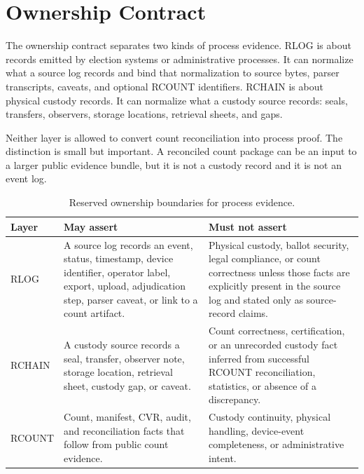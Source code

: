 \section{Ownership Contract}

The ownership contract separates two kinds of process evidence. RLOG is about
records emitted by election systems or administrative processes. It can
normalize what a source log records and bind that normalization to source
bytes, parser transcripts, caveats, and optional RCOUNT identifiers. RCHAIN is
about physical custody records. It can normalize what a custody source records:
seals, transfers, observers, storage locations, retrieval sheets, and gaps.

Neither layer is allowed to convert count reconciliation into process proof.
The distinction is small but important. A reconciled count package can be an
input to a larger public evidence bundle, but it is not a custody record and it
is not an event log.

\begin{table}[h]
\centering
\small
\begin{tabularx}{\textwidth}{@{}lXX@{}}
\toprule
Layer & May assert & Must not assert \\
\midrule
RLOG & A source log records an event, status, timestamp, device identifier,
operator label, export, upload, adjudication step, parser caveat, or link to a
count artifact. & Physical custody, ballot security, legal compliance, or count
correctness unless those facts are explicitly present in the source log and
stated only as source-record claims. \\
RCHAIN & A custody source records a seal, transfer, observer note, storage
location, retrieval sheet, custody gap, or caveat. & Count correctness,
certification, or an unrecorded custody fact inferred from successful RCOUNT
reconciliation, statistics, or absence of a discrepancy. \\
RCOUNT & Count, manifest, CVR, audit, and reconciliation facts that follow from
public count evidence. & Custody continuity, physical handling, device-event
completeness, or administrative intent. \\
\bottomrule
\end{tabularx}
\caption{Reserved ownership boundaries for process evidence.}
\end{table}
